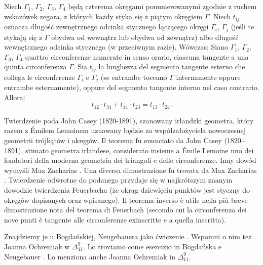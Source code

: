 \begin{theorem}
[Caseya, 1866] %
[di Casey, 1866] %
%
    Niech $\Gamma_1$, $\Gamma_2$, $\Gamma_3$, $\Gamma_4$ będą czterema okręgami ponumerowanymi zgodnie z ruchem wskazówek zegara, z których każdy styka się z piątym okręgiem $\Gamma$. %
    Niech $t_{ij}$ oznacza długość zewnętrznego odcinka stycznego łączącego okręgi $\Gamma_i$, $\Gamma_j$ (jeśli te stykają się z $\Gamma$ obydwa od wewnątrz lub obydwa od zewnątrz) albo długość wewnętrznego odcinka stycznego (w przeciwnym razie). %
    Wówczas: %
    Siano $\Gamma_1$, $\Gamma_2$, $\Gamma_3$, $\Gamma_4$ quattro circonferenze numerate in senso orario, ciascuna tangente a una quinta circonferenza $\Gamma$. %
    Sia $t_{ij}$ la lunghezza del segmento tangente esterno che collega le circonferenze $\Gamma_i$ e $\Gamma_j$ (se entrambe toccano $\Gamma$ internamente oppure entrambe esternamente), oppure del segmento tangente interno nel caso contrario. %
    Allora: %
    \begin{equation}
        t_{12} \cdot t_{34} + t_{14} \cdot t_{23} = t_{13} \cdot t_{24}.
    \end{equation}
\end{theorem}

Twierdzenie poda John Casey (1820-1891), szanowany irlandzki geometra, który razem z Émilem Lemoinem uznawany będzie za współzałożyciela nowoczesnej geometrii trójkątów i okręgów. %
Il teorema fu enunciato da John Casey (1820--1891), stimato geometra irlandese, considerato insieme a Émile Lemoine uno dei fondatori della moderna geometria dei triangoli e delle circonferenze. %
%
%
Inny dowód wymyśli Max Zacharias \cite{zacharias_1942}. %
Una diversa dimostrazione fu trovata da Max Zacharias \cite{zacharias_1942}. %
%
Twierdzenie odwrotne do podanego przydaje się w najkrótszym znanym dowodzie twierdzenia Feuerbacha (że okrąg dziewięciu punktów jest styczny do okręgów dopisanych oraz wpisanego). %
Il teorema inverso è utile nella più breve dimostrazione nota del teorema di Feuerbach (secondo cui la circonferenza dei nove punti è tangente alle circonferenze exinscritte e a quella inscritta). %
%
%
%
%

Znajdziemy je u Bogdańskiej, Neugebauera jako ćwiczenie \cite[s. 105]{neugebauer_2018}. %
Wspomni o nim też Joanna Ochremiak w $\Delta_{11}^9$. %
Lo troviamo come esercizio in Bogdańska e Neugebauer \cite[p. 105]{neugebauer_2018}. %
Lo menziona anche Joanna Ochremiak in $\Delta_{11}^9$. %

%
